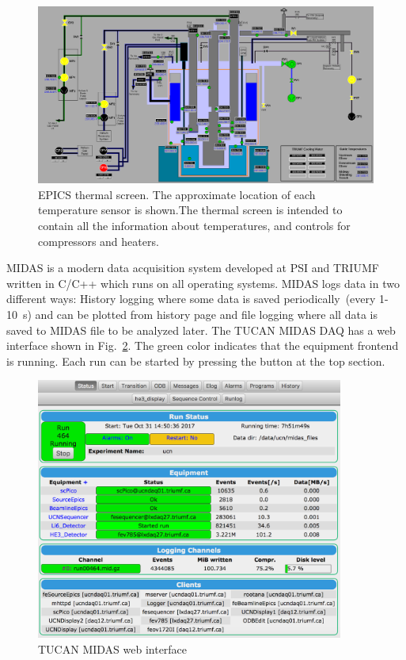 \begin{figure}[h!]
  \centering
  \includegraphics[width=1.0\textwidth]{epics.png}
  \caption{EPICS thermal screen. The approximate location of each
    temperature sensor is shown.The thermal screen is intended to
    contain all the information about temperatures, and controls for
    compressors and heaters. }
  \label{fig:epics}
\end{figure}

MIDAS is a modern data acquisition system developed at PSI and TRIUMF
written in C/C++ which runs on all operating systems. MIDAS logs data
in two different ways: History logging where some data is saved
periodically~(every 1-10~s) and can be plotted from history page and
file logging where all data is saved to MIDAS file to be analyzed
later. The TUCAN MIDAS DAQ has a web interface shown in
Fig.~\ref{fig:midas}. The green color indicates that the equipment
frontend is running. Each run can be started by pressing the button at
the top section.

\begin{figure}[h!]
  \centering
  \includegraphics[width=0.9\textwidth]{midas.png}
  \caption{TUCAN MIDAS web interface }
  \label{fig:midas}
\end{figure}

